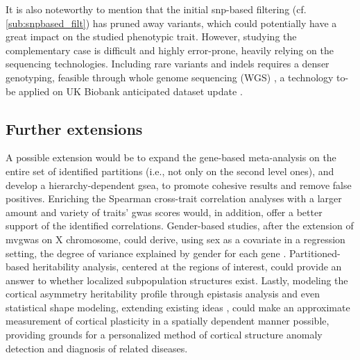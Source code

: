It is also noteworthy to mention that the initial \ac{snp}-based filtering (cf. \autoref{sub:snpbased_filt}) has pruned away variants, which could potentially have a great impact on the studied phenotypic trait. However, studying the complementary case is difficult and highly error-prone, heavily relying on the sequencing technologies. Including rare variants and indels requires a denser genotyping, feasible through whole genome sequencing (WGS) \cite{Kierczak2022,Cirulli2020}, a technology to-be applied on UK Biobank anticipated dataset update \cite{Halldorsson2022}.


\subsection{Further extensions}
A possible extension would be to expand the gene-based meta-analysis on the entire set of identified partitions (i.e., not only on the second level ones), and develop a hierarchy-dependent \ac{gsea}, to promote cohesive results and remove false positives. Enriching the Spearman cross-trait correlation analyses with a larger amount and variety of traits' \ac{gwas} scores would, in addition, offer a better support of the identified correlations. Gender-based studies, after  the extension of \ac{mvgwas} on X chromosome, could derive, using sex as a covariate in a regression setting, the degree of variance explained by gender for each gene \cite{Rawlik2016}. Partitioned-based heritability analysis, centered at the regions of interest, could provide an answer to whether localized subpopulation structures exist. Lastly, modeling the cortical asymmetry heritability profile through epistasis analysis and even statistical shape modeling, extending existing ideas \cite{Filipe2019,Claes2014,White2020}, could make an approximate measurement of cortical plasticity in a spatially dependent manner possible, providing grounds for a personalized method of cortical structure anomaly detection and diagnosis of related diseases.


